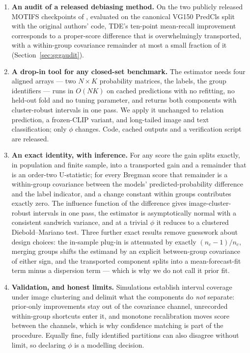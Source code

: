 \begin{enumerate}
\item \textbf{An audit of a released debiasing method.} On the two publicly released MOTIFS
checkpoints of \citet{tang2020unbiased}, evaluated on the canonical VG150 PredCls split with
the original authors' code, TDE's ten-point mean-recall improvement corresponds to a
proper-score difference that is overwhelmingly transported, with a within-group covariance
remainder at most a small fraction of it (Section~\ref{sec:sggaudit}).

\item \textbf{A drop-in tool for any closed-set benchmark.} The estimator needs four aligned
arrays --- two $N\times K$ probability matrices, the labels, the group identifiers --- runs
in $O(NK)$ on cached predictions with no refitting, no held-out fold and no tuning parameter,
and returns both components with cluster-robust intervals in one pass. We apply it unchanged
to relation prediction, a frozen-CLIP variant, and long-tailed image and text classification;
only $\phi$ changes. Code, cached outputs and a verification script are released.

\item \textbf{An exact identity, with inference.} For any score the gain splits exactly, in
population and finite sample, into a transported gain and a remainder that is an order-two
U-statistic; for every Bregman score that remainder is a within-group covariance between the
models' predicted-probability difference and the label indicator, and a change constant
within groups contributes exactly zero. The influence function of the difference gives
image-cluster-robust intervals in one pass, the estimator is asymptotically normal with a
consistent sandwich variance, and at a trivial $\phi$ it reduces to a clustered
Diebold--Mariano test. Three further exact results remove guesswork about design choices: the
in-sample plug-in is attenuated by exactly $(n_c-1)/n_c$, merging groups shifts the estimand
by an explicit between-group covariance of either sign, and the transported component splits
into a mean-forecast-fit term minus a dispersion term --- which is why we do not call it
prior fit.

\item \textbf{Validation, and honest limits.} Simulations establish interval coverage under
image clustering and delimit what the components do \emph{not} separate: prior-only
improvements stay out of the covariance channel, unrecorded within-group shortcuts enter it,
and monotone recalibration moves score between the channels, which is why confidence matching
is part of the procedure. Equally fine, fully identified partitions can also disagree without
limit, so declaring $\phi$ is a modelling decision.
\end{enumerate}

